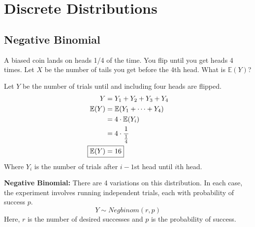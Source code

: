 \documentclass[titlepage, 12pt, leqno]{article}
\begin{document}
\pagebreak
\section{Discrete Distributions}
\subsection{Negative Binomial}
\begin{ex}
    A biased coin lands on heads 1/4 of the time. You flip until
    you get heads 4 times. Let $X$ be the number of tails you get before the 4th
    head. What is $ \mathbb{E}(Y)$?
    \vspace{10px}

    Let $Y$ be the number of trials until and including four heads are flipped.
   \begin{align*}
       Y &= Y_1 + Y_2 + Y_3 + Y_4 \\
       \mathbb{E}(Y) &= \mathbb{E}(Y_1 + \cdots + Y_4) \\
                     &= 4 \cdot\mathbb{E}(Y_i) \\
                     &= 4 \cdot \frac{1}{\frac{1}{4}} \\
       \Aboxed{ \mathbb{E}(Y) &= 16} 
   \end{align*}
    Where $Y_i$ is the number of trials after $i-1$st head until $i$th head.
    
\end{ex}

\begin{definition}
    \textbf{Negative Binomial:} There are 4 variations on this distribution. In
    each case, the experiment involves running independent trials, each with 
    probability of success $p$.
    \[
    Y \sim Negbinom(r,p)
    \]
    Here, $r$ is the number of desired successes and $p$ is the probability of
    success.
\end{definition}
\end{document}
